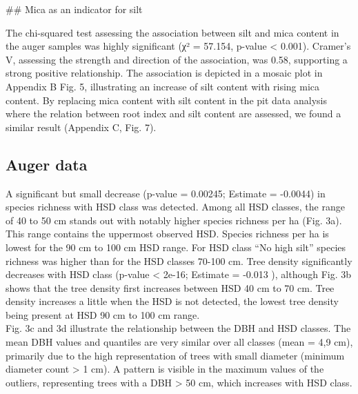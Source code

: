 \documentclass[fleqn,12pt]{latex/stylish_article} %
\begin{document}
\normalsize
\#\# Mica as an indicator for silt

The chi-squared test assessing the association between silt and mica content in the auger samples was highly significant (χ² = 57.154, p-value \textless{} 0.001). Cramer's V, assessing the strength and direction of the association, was 0.58, supporting a strong positive relationship. The association is depicted in a mosaic plot in Appendix B Fig. 5, illustrating an increase of silt content with rising mica content. By replacing mica content with silt content in the pit data analysis where the relation between root index and silt content are assessed, we found a similar result (Appendix C, Fig. 7).

\hypertarget{auger-data}{%
\subsection{Auger data}\label{auger-data}}

A significant but small decrease (p-value = 0.00245; Estimate = -0.0044) in species richness with HSD class was detected. Among all HSD classes, the range of 40 to 50 cm stands out with notably higher species richness per ha (Fig. 3a). This range contains the uppermost observed HSD. Species richness per ha is lowest for the 90 cm to 100 cm HSD range. For HSD class \enquote{No high silt} species richness was higher than for the HSD classes 70-100 cm. Tree density significantly decreases with HSD class (p-value \textless{} 2e-16; Estimate = -0.013 ), although Fig. 3b shows that the tree density first increases between HSD 40 cm to 70 cm. Tree density increases a little when the HSD is not detected, the lowest tree density being present at HSD 90 cm to 100 cm range.\\
Fig. 3c and 3d illustrate the relationship between the DBH and HSD classes. The mean DBH values and quantiles are very similar over all classes (mean = 4,9 cm), primarily due to the high representation of trees with small diameter (minimum diameter count \textgreater{} 1 cm). A pattern is visible in the maximum values of the outliers, representing trees with a DBH \textgreater{} 50 cm, which increases with HSD class.



\scriptsize
\end{document}
